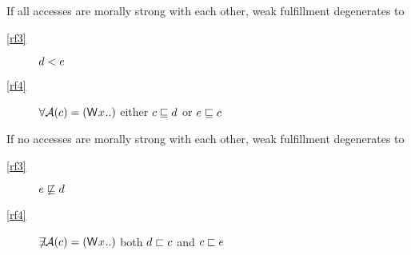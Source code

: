 If all accesses are morally strong with each other, weak fulfillment
degenerates to
\begin{description}
\item[\eqref{rf3}]
  $d < e$
\item[\eqref{rf4}]
  $\forall\labelingAct(\cEv)=(\DW[]{x}{..})$ either
  $c \sqsubseteq d$ or $e \sqsubseteq c$
\end{description}

If no accesses are morally strong with each other, weak fulfillment
degenerates to
\begin{description}
\item[\eqref{rf3}]
  $e \not\sqsubseteq d$
\item[\eqref{rf4}]
  $\not\mkern-5mu\exists\labelingAct(\cEv)=(\DW[]{x}{..})$ 
  both $d \sqsubset c$ and $c \sqsubset e$
\end{description}
